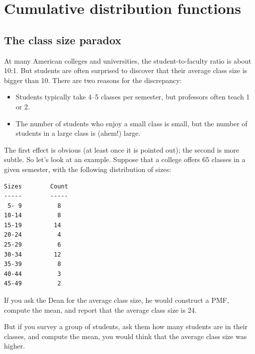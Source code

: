 \documentclass[12pt]{book}
\begin{document}
\chapter{Cumulative distribution functions}
\label{cumulative}

\section{The class size paradox}

At many American colleges and universities, the student-to-faculty
ratio is about 10:1.  But students are often surprised to discover
that their average class size is bigger than 10.  There
are two reasons for the discrepancy:

\begin{itemize}

\item Students typically take 4--5 classes per semester, but
professors often teach 1 or 2.

\item The number of students who enjoy a small class is small,
but the number of students in a large class is (ahem!) large.

\end{itemize}

The first effect is obvious (at least once it is pointed out);
the second is more subtle.  So let's look at an example.  Suppose
that a college offers 65 classes in a given semester, with the
following distribution of sizes:

\begin{verbatim}
Sizes        Count
-----        -----
 5- 9          8
10-14          8
15-19         14
20-24          4
25-29          6
30-34         12
35-39          8
40-44          3
45-49          2
\end{verbatim}

If you ask the Dean for the average class size, he would
construct a PMF, compute the mean, and report that the
average class size is 24.

But if you survey a group of students, ask them how many
students are in their classes, and compute the mean, you would
think that the average class size was higher.
\end{document}
